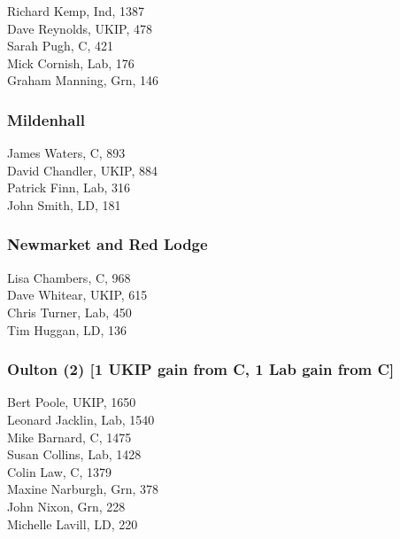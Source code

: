\documentclass[a4paper,openany,10pt]{book}
\begin{document}
Richard Kemp, Ind, 1387\\
Dave Reynolds, UKIP, 478\\
Sarah Pugh, C, 421\\
Mick Cornish, Lab, 176\\
Graham Manning, Grn, 146\\


\subsubsection*{Mildenhall}



James Waters, C, 893\\
David Chandler, UKIP, 884\\
Patrick Finn, Lab, 316\\
John Smith, LD, 181\\


\subsubsection*{Newmarket and Red Lodge}



Lisa Chambers, C, 968\\
Dave Whitear, UKIP, 615\\
Chris Turner, Lab, 450\\
Tim Huggan, LD, 136\\


\subsubsection*{Oulton (2) \hspace*{\fill}\nolinebreak[1]%
\enspace\hspace*{\fill}
[1 UKIP gain from C, 1 Lab gain from C]}



Bert Poole, UKIP, 1650\\
Leonard Jacklin, Lab, 1540\\
Mike Barnard, C, 1475\\
Susan Collins, Lab, 1428\\
Colin Law, C, 1379\\
Maxine Narburgh, Grn, 378\\
John Nixon, Grn, 228\\
Michelle Lavill, LD, 220\\
\end{document}
